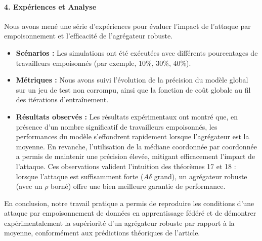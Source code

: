 \documentclass{article}
\begin{document}
\paragraph{4. Expériences et Analyse}
Nous avons mené une série d'expériences pour évaluer l'impact de l'attaque par empoisonnement et l'efficacité de l'agrégateur robuste.
\begin{itemize}
    \item \textbf{Scénarios :} Les simulations ont été exécutées avec différents pourcentages de travailleurs empoisonnés (par exemple, 10\%, 30\%, 40\%).
    \item \textbf{Métriques :} Nous avons suivi l'évolution de la précision du modèle global sur un jeu de test non corrompu, ainsi que la fonction de coût globale au fil des itérations d'entraînement.
    \item \textbf{Résultats observés :} Les résultats expérimentaux ont montré que, en présence d'un nombre significatif de travailleurs empoisonnés, les performances du modèle s'effondrent rapidement lorsque l'agrégateur est la moyenne. En revanche, l'utilisation de la médiane coordonnée par coordonnée a permis de maintenir une précision élevée, mitigant efficacement l'impact de l'attaque. Ces observations valident l'intuition des théorèmes 17 et 18 : lorsque l'attaque est suffisamment forte ($A\delta$ grand), un agrégateur robuste (avec un $\rho$ borné) offre une bien meilleure garantie de performance.
\end{itemize}

En conclusion, notre travail pratique a permis de reproduire les conditions d'une attaque par empoisonnement de données en apprentissage fédéré et de démontrer expérimentalement la supériorité d'un agrégateur robuste par rapport à la moyenne, conformément aux prédictions théoriques de l'article.
\end{document}
